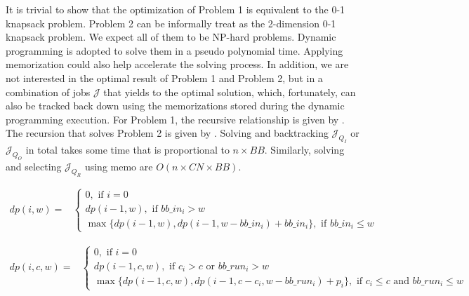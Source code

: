 It is trivial to show that the optimization of Problem 1
is equivalent to the 0-1 knapsack problem.
Problem 2 can be informally treat as the 2-dimension 0-1 knapsack problem.
We expect all of them to be NP-hard problems.
Dynamic programming is adopted to solve them in a pseudo polynomial time.
Applying memorization could also help accelerate the solving process.
In addition, we are not interested in the optimal result of
Problem 1 and Problem 2,
but in a combination of jobs $\mathcal{J}$ that yields to the optimal solution,
which, fortunately, can also be tracked back down using the memorizations stored during the dynamic programming execution.
For Problem 1, the recursive relationship is given by .
The recursion that solves Problem 2 is given by .
Solving  and 
backtracking $\mathcal{J}_{Q_I}$ or $\mathcal{J}_{Q_O}$ in total takes some time that is proportional to $n\times BB$.
Similarly, solving  and selecting $\mathcal{J}_{Q_R}$ using memo
are $O(n\times CN\times BB)$.


\begin{strip}
        \begin{align}
                dp(i, w) = & 
                \left\{
                        \begin{array}{l}
                                0, \text{ if $i=0$ } \\ [0.6em]
                                dp(i-1, w), \text{ if $bb\_in_i > w$} \\ [0.6em]
                                \max \{ dp(i-1, w), dp(i-1, w-bb\_in_i) + bb\_in_i \}, \text{ if $bb\_in_i \leq w$}
                        \end{array} 
                \right.
                \label{Equ:MaxTransferDataRecursion} 
        \end{align}
\end{strip}

\begin{strip}
        \begin{align}
                dp(i, c, w) = &
                \left\{
                        \begin{array}{l}
                                0, \text{ if $i=0$ } \\ [0.6em]
                                dp(i-1, c, w), \text{ if $c_i > c$ or $bb\_run_i > w$} \\ [0.6em]
                                \max \{ dp(i-1, c, w), dp(i-1, c - c_i, w - bb\_run_i) + p_i \}, \text{ if $c_i \leq c$ and $bb\_run_i \leq w$}
                        \end{array} 
                \right.
                \label{Equ:MaxProductRecursion}
        \end{align}
\end{strip}


